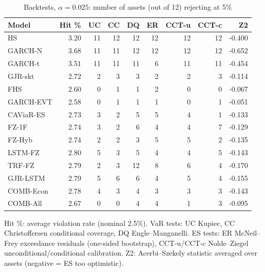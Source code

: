 \begin{table}[htbp]
\centering
\footnotesize
\caption{Backtests, $\alpha=0.025$: number of assets (out of 12) rejecting at 5\%}
\label{tab:bt_a025}
\begin{tabular}{lrrrrrrrr}
\toprule
Model & Hit \% & UC & CC & DQ & ER & CCT-u & CCT-c & Z2 \\
\midrule
HS & 3.20 & 11 & 12 & 12 & 12 & 12 & 12 & -0.400 \\
GARCH-N & 3.68 & 11 & 11 & 12 & 12 & 12 & 12 & -0.652 \\
GARCH-t & 3.51 & 11 & 11 & 11 & 6 & 11 & 11 & -0.454 \\
GJR-skt & 2.72 & 2 & 3 & 3 & 2 & 2 & 3 & -0.114 \\
FHS & 2.60 & 0 & 1 & 1 & 2 & 0 & 0 & -0.067 \\
GARCH-EVT & 2.58 & 0 & 1 & 1 & 1 & 0 & 1 & -0.051 \\
CAViaR-ES & 2.73 & 3 & 2 & 5 & 5 & 4 & 1 & -0.133 \\
FZ-1F & 2.74 & 3 & 2 & 6 & 4 & 4 & 7 & -0.129 \\
FZ-Hyb & 2.74 & 2 & 2 & 3 & 5 & 5 & 2 & -0.135 \\
LSTM-FZ & 2.80 & 5 & 3 & 5 & 4 & 4 & 5 & -0.143 \\
TRF-FZ & 2.79 & 2 & 3 & 12 & 8 & 6 & 4 & -0.170 \\
GJR-LSTM & 2.79 & 5 & 6 & 6 & 4 & 5 & 4 & -0.155 \\
COMB-Econ & 2.78 & 4 & 3 & 4 & 3 & 3 & 3 & -0.143 \\
COMB-All & 2.67 & 0 & 0 & 4 & 4 & 1 & 3 & -0.095 \\
\bottomrule
\end{tabular}
\par\smallskip\parbox{\linewidth}{\scriptsize Hit \%: average violation rate (nominal 2.5\%). VaR tests: UC Kupiec, CC Christoffersen conditional coverage, DQ Engle--Manganelli. ES tests: ER McNeil--Frey exceedance residuals (one-sided bootstrap), CCT-u/CCT-c Nolde--Ziegel unconditional/conditional calibration. Z2: Acerbi--Szekely statistic averaged over assets (negative = ES too optimistic).}
\end{table}